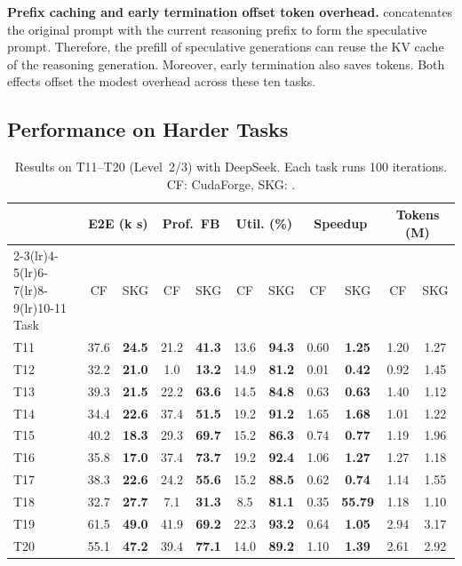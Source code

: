 \noindent\textbf{Prefix caching and early termination offset token overhead.}
\sysname{} concatenates the original prompt with the current
reasoning prefix to form the speculative prompt. Therefore, the prefill of speculative generations can reuse the KV cache of the reasoning generation.
Moreover, early termination also saves tokens.
Both effects offset the modest overhead across these ten tasks.

\subsection{Performance on Harder Tasks}\label{subsec:eval_harder_tasks}
\begin{table}[t]
\centering
\caption{Results on T11--T20 (Level~2/3) with DeepSeek. Each task runs 100 iterations. CF: CudaForge, SKG: \textbf{\sysname{}}.}
\vspace{-10pt}
\label{tab:comparison-t11-t20}
\small
\setlength{\tabcolsep}{2.3pt}
\renewcommand{\arraystretch}{0.9}
\begin{tabular}{@{}l cc cc cc cc cc@{}}
    \toprule
    & \multicolumn{2}{c}{E2E (k s)} & \multicolumn{2}{c}{Prof.\ FB} & \multicolumn{2}{c}{Util. (\%)} & \multicolumn{2}{c}{Speedup} & \multicolumn{2}{c}{Tokens (M)} \\
    \cmidrule(lr){2-3}\cmidrule(lr){4-5}\cmidrule(lr){6-7}\cmidrule(lr){8-9}\cmidrule(lr){10-11}
    Task & CF & SKG & CF & SKG & CF & SKG & CF & SKG & CF & SKG \\
    \midrule
    T11 & 37.6 & \textbf{24.5} & 21.2 & \textbf{41.3} & 13.6 & \textbf{94.3} & 0.60 & \textbf{1.25} & 1.20 & 1.27 \\
    T12 & 32.2 & \textbf{21.0} &  1.0 & \textbf{13.2} & 14.9 & \textbf{81.2} & 0.01 & \textbf{0.42} & 0.92 & 1.45 \\
    T13 & 39.3 & \textbf{21.5} & 22.2 & \textbf{63.6} & 14.5 & \textbf{84.8} & 0.63 & \textbf{0.63} & 1.40 & 1.12 \\
    T14 & 34.4 & \textbf{22.6} & 37.4 & \textbf{51.5} & 19.2 & \textbf{91.2} &  1.65 & \textbf{1.68} & 1.01 & 1.22 \\
    T15 & 40.2 & \textbf{18.3} & 29.3 & \textbf{69.7} & 15.2 & \textbf{86.3} &  0.74 & \textbf{0.77} & 1.19 & 1.96 \\
    T16 & 35.8 & \textbf{17.0} & 37.4 & \textbf{73.7} & 19.2 & \textbf{92.4} &  1.06 & \textbf{1.27} & 1.27 & 1.18 \\
    T17 & 38.3 & \textbf{22.6} & 24.2 & \textbf{55.6} & 15.2 & \textbf{88.5} &  0.62 & \textbf{0.74} & 1.14 & 1.55 \\
    T18 & 32.7 & \textbf{27.7} &  7.1 & \textbf{31.3} &  8.5 & \textbf{81.1} &  0.35 & \textbf{55.79} & 1.18 & 1.10 \\
    T19 & 61.5 & \textbf{49.0} & 41.9 & \textbf{69.2} & 22.3 & \textbf{93.2} &  0.64 & \textbf{1.05}  & 2.94 & 3.17 \\
    T20 & 55.1 & \textbf{47.2} & 39.4 & \textbf{77.1} & 14.0 & \textbf{89.2} &  1.10 & \textbf{1.39}  & 2.61 & 2.92 \\
    \bottomrule
\end{tabular}
\vspace{-15pt}
\end{table}

